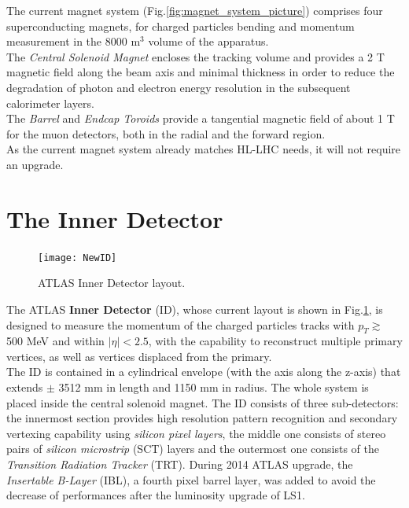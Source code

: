 \documentclass[a4paper,twoside,12pt]{book}
\begin{document}
The current magnet system (Fig.\ref{fig:magnet_system_picture}) comprises four superconducting magnets\cite{magnet_system}, for charged particles bending and momentum measurement in the $8000$ m$^3$ volume of the apparatus.\\

The \textit{Central Solenoid Magnet} encloses the tracking volume and provides a 2 T magnetic field along the beam axis and minimal thickness in order to reduce the degradation of photon and electron energy resolution in the subsequent calorimeter layers.\\

The \textit{Barrel} and \textit{Endcap Toroids} provide a tangential magnetic field of about 1 T for the muon detectors, both in the radial and the forward region.\\

As the current magnet system already matches HL-LHC needs, it will not require an
upgrade.

\section{The Inner Detector}\label{sec:detector:tracker}

\begin{figure} [h]
\centering
	\texttt{[image: NewID]}
	\caption{ATLAS Inner Detector layout\cite{Aad:2008zzm}.}
	\label{fig:IDLayout}
\end{figure}

The ATLAS \textbf{Inner Detector} (ID), whose current layout is shown in \mbox{Fig.\ref{fig:IDLayout}}, is designed to measure the momentum of the
charged particles tracks with $p_{T} \gtrsim$ 500 MeV and 
within $|\eta| < 2.5$, with the capability to reconstruct multiple primary vertices, as well as vertices displaced from the primary\cite{Aad:2008zzm}. \\

The ID is contained in a cylindrical envelope (with the axis along the z-axis) that extends
$\pm$ 3512 mm in length and 1150 mm in radius. The whole system is placed inside
the central solenoid magnet. The ID consists of three sub-detectors: the innermost section provides
high resolution pattern recognition and secondary vertexing capability using \textit{silicon pixel layers}, the middle one consists of stereo pairs of \textit{silicon microstrip} (SCT) layers and the outermost one consists of the \textit{Transition Radiation Tracker} (TRT). During 2014 ATLAS upgrade, the \textit{Insertable B-Layer} (IBL), a fourth pixel barrel layer, was added to avoid the decrease of performances after the luminosity upgrade of LS1. \\
\end{document}
